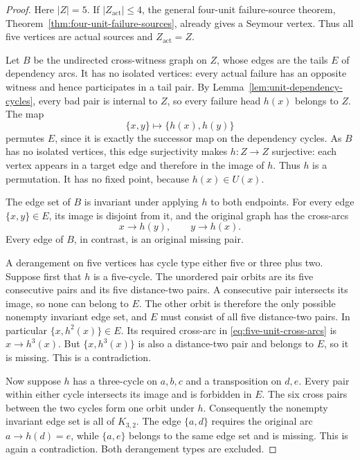 \begin{proof}
Here $|Z|=5$. If $|Z_{\mathrm{act}}|\le4$, the general four-unit
failure-source theorem, Theorem~\ref{thm:four-unit-failure-sources},
already gives a Seymour vertex. Thus all five vertices are actual
sources and $Z_{\mathrm{act}}=Z$.

Let $B$ be the undirected cross-witness graph on $Z$, whose edges
are the tails $E$ of dependency arcs. It has no isolated vertices:
every actual failure has an opposite witness and hence participates
in a tail pair. By Lemma~\ref{lem:unit-dependency-cycles}, every bad
pair is internal to $Z$, so every failure head $h(x)$ belongs to $Z$.
The map
\[
 \{x,y\}\longmapsto\{h(x),h(y)\}
\]
permutes $E$, since it is exactly the successor map on the dependency
cycles. As $B$ has no isolated vertices, this edge surjectivity makes
$h:Z\to Z$ surjective: each vertex appears in a target edge and
therefore in the image of $h$. Thus $h$ is a permutation. It has
no fixed point, because $h(x)\in U(x)$.

The edge set of $B$ is invariant under applying $h$ to both endpoints.
For every edge $\{x,y\}\in E$, its image is disjoint from it, and
the original graph has the cross-arcs
\[
 x\to h(y),\qquad y\to h(x).
 \tag{U5}\label{eq:five-unit-cross-arcs}
\]
Every edge of $B$, in contrast, is an original missing pair.

A derangement on five vertices has cycle type either five or three
plus two. Suppose first that $h$ is a five-cycle. The unordered
pair orbits are its five consecutive pairs and its five
distance-two pairs. A consecutive pair intersects its image,
so none can belong to $E$. The other orbit is therefore the only
possible nonempty invariant edge set, and $E$ must consist of all
five distance-two pairs. In particular $\{x,h^2(x)\}\in E$.
Its required cross-arc in \eqref{eq:five-unit-cross-arcs} is
$x\to h^3(x)$. But $\{x,h^3(x)\}$ is also a distance-two pair
and belongs to $E$, so it is missing. This is a contradiction.

Now suppose $h$ has a three-cycle on $a,b,c$ and a transposition
on $d,e$. Every pair within either cycle intersects its image and
is forbidden in $E$. The six cross pairs between the two cycles
form one orbit under $h$. Consequently the nonempty invariant
edge set is all of $K_{3,2}$. The edge $\{a,d\}$ requires the
original arc $a\to h(d)=e$, while $\{a,e\}$ belongs to the same
edge set and is missing. This is again a contradiction.
Both derangement types are excluded.
\end{proof}

